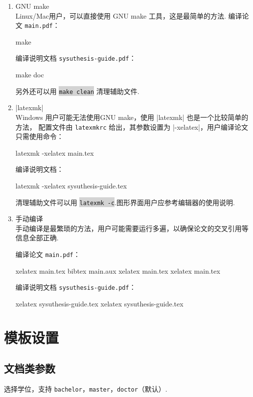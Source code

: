 \documentclass[a4paper]{ltxdoc}
\makeatletter
\DeclareRobustCommand\file{\nolinkurl}
\DeclareRobustCommand\opt{\texttt}
\def\DescribeOption{\leavevmode\@bsphack\begingroup\MakePrivateLetters
  \Describe@Option}
\def\Describe@Option#1{\endgroup
              \marginpar{\raggedleft\PrintDescribeOption{#1}}%
              \SpecialEnvIndex{#1}\@esphack\ignorespaces}
\newcommand\shellcmd[1]{\colorbox{lightgray}{\lstinline[style=lstshell]|#1|}}
\makeatother
\begin{document}
\begin{enumerate}

\item GNU make \\
Linux/Mac用户，可以直接使用 GNU make 工具，这是最简单的方法.
编译论文 \file{main.pdf}：
\begin{shell}
  make
\end{shell}
编译说明文档 \file{sysuthesis-guide.pdf}：
\begin{shell}
  make doc
\end{shell}
另外还可以用 \shellcmd{make clean} 清理辅助文件.

\item |latexmk| \\
Windows 用户可能无法使用GNU make，使用 |latexmk| 也是一个比较简单的方法，
配置文件由 \file{latexmkrc} 给出，其参数设置为 |-xelatex|，用户编译论文
只需使用命令：
\begin{shell}
  latexmk -xelatex main.tex
\end{shell}
编译说明文档：
\begin{shell}
  latexmk -xelatex sysuthesis-guide.tex
\end{shell}
清理辅助文件可以用 \shellcmd{latexmk -c}.图形界面用户应参考编辑器的使用说明.

\item 手动编译 \\
手动编译是最繁琐的方法，用户可能需要运行多遍，以确保论文的交叉引用等信息全部正确.

编译论文 \file{main.pdf}：
\begin{shell}
  xelatex main.tex
  bibtex main.aux
  xelatex main.tex
  xelatex main.tex
\end{shell}
编译说明文档 \file{sysuthesis-guide.pdf}：
\begin{shell}
  xelatex sysuthesis-guide.tex
  xelatex sysuthesis-guide.tex
\end{shell}
\end{enumerate}



\section{模板设置}


\subsection{文档类参数}
\DescribeOption{degree}
选择学位，支持 \opt{bachelor}，\opt{master}，\opt{doctor}（默认）.
\end{document}

